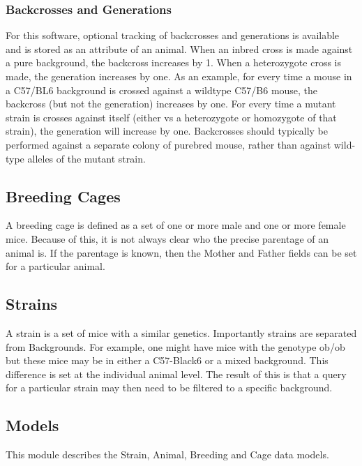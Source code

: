 \documentclass[letterpaper,10pt,english]{sphinxmanual}
\begin{document}
\subsubsection{Backcrosses and Generations}
\label{api:backcrosses-and-generations}
For this software, optional tracking of backcrosses and generations is available and is stored as an attribute of an animal.  When an inbred cross is made against a pure background, the backcross increases by 1.  When a heterozygote cross is made, the generation increases by one.  As an example, for every time a mouse in a C57/BL6 background is crossed against a wildtype C57/B6 mouse, the backcross (but not the generation) increases by one.  For every time a mutant strain is crosses against itself (either vs a heterozygote or homozygote of that strain), the generation will increase by one.  Backcrosses should typically be performed against a separate colony of purebred mouse, rather than against wild-type alleles of the mutant strain.


\subsection{Breeding Cages}
\label{api:breeding-cages}
A breeding cage is defined as a set of one or more male and one or more female mice.  Because of this, it is not always clear who the precise parentage of an animal is.  If the parentage is known, then the Mother and Father fields can be set for a particular animal.


\subsection{Strains}
\label{api:strains}
A strain is a set of mice with a similar genetics.  Importantly strains are separated from Backgrounds.  For example, one might have mice with the genotype ob/ob but these mice may be in either a C57-Black6 or a mixed background.  This difference is set at the individual animal level.  
The result of this is that a query for a particular strain may then need to be filtered to a specific background.


\subsection{Models}
\label{api:id3}\label{api:module-mousedb.animal.models}
This module describes the Strain, Animal, Breeding and Cage data models.
\end{document}
